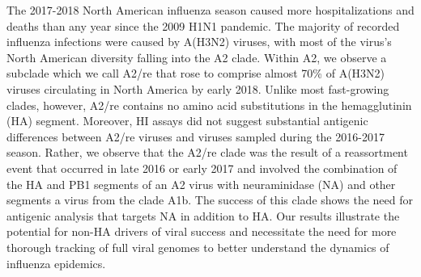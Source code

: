 The 2017-2018 North American influenza season caused more hospitalizations and deaths than any year since the 2009 H1N1 pandemic.
The majority of recorded influenza infections were caused by A(H3N2) viruses, with most of the virus’s North American diversity falling into the A2 clade.
Within A2, we observe a subclade which we call A2/re that rose to comprise almost 70\% of A(H3N2) viruses circulating in North America by early 2018.
Unlike most fast-growing clades, however, A2/re contains no amino acid substitutions in the hemagglutinin (HA) segment.
Moreover, HI assays did not suggest substantial antigenic differences between A2/re viruses and viruses sampled during the 2016-2017 season.
Rather, we observe that the A2/re clade was the result of a reassortment event that occurred in late 2016 or early 2017 and involved the combination of the HA and PB1 segments of an A2 virus with neuraminidase (NA) and other segments a virus from the clade A1b.
The success of this clade shows the need for antigenic analysis that targets NA in addition to HA.
Our results illustrate the potential for non-HA drivers of viral success and necessitate the need for more thorough tracking of full viral genomes to better understand the dynamics of influenza epidemics.
